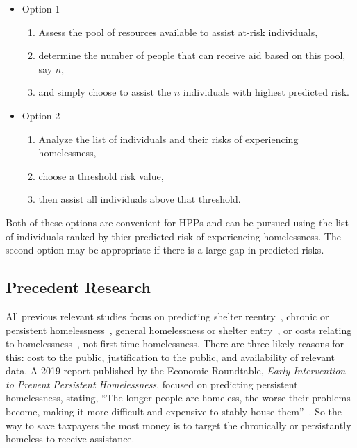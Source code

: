 \documentclass[10pt,letterpaper]{article}
\begin{document}
\begin{itemize}
    \item Option 1
    \begin{enumerate}
        \item Assess the pool of resources available to assist at-risk individuals,
        \item determine the number of people that can receive aid based on this pool, say $n$,
        \item and simply choose to assist the $n$ individuals with highest predicted risk.
    \end{enumerate}
    \item Option 2
    \begin{enumerate}
        \item Analyze the list of individuals and their risks of experiencing homelessness,
        \item choose a threshold risk value,
        \item then assist all individuals above that threshold.
    \end{enumerate}
\end{itemize}

Both of these options are convenient for HPPs and can be pursued using the list of individuals ranked by thier predicted risk of experiencing homelessness. The second option may be appropriate if there is a large gap in predicted risks.

\subsection*{Precedent Research}
All previous relevant studies focus on predicting shelter reentry~\cite{hong2018applications}, chronic or persistent homelessness~\cite{vanberlo2021interpretable, toros2019early}, general homelessness or shelter entry~\cite{byrne2020classification, shinn2013efficient}, or costs relating to homelessness~\cite{flaming2011crisis}, not first-time homelessness. There are three likely reasons for this: cost to the public, justification to the public, and availability of relevant data. A 2019 report published by the Economic Roundtable, \textit{Early Intervention to Prevent Persistent Homelessness}, focused on predicting persistent homelessness, stating, ``The longer people are homeless, the worse their problems become, making it more difficult and expensive to stably house them''~\cite{toros2019early}. So the way to save taxpayers the most money is to target the chronically or persistantly homeless to receive assistance. 
\end{document}
